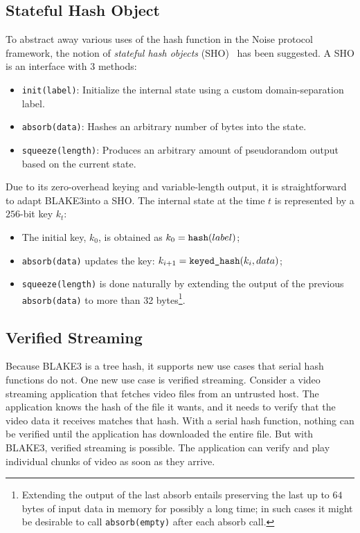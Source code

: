 \documentclass[11pt,notitlepage,a4paper]{article}
\newcommand{\flag}[1]{\texttt{\detokenize{#1}}\xspace}
\begin{document}
\subsection{Stateful Hash Object}\label{sec:sho}

To abstract away various uses of the hash function in the Noise protocol framework, the notion of \emph{stateful hash objects} (SHO)~\cite{Perrin19} has been suggested. A SHO is an interface with 3 methods:
\begin{itemize}
  \item \texttt{init(label)}: Initialize the internal state using a custom domain-separation label.
  \item \texttt{absorb(data)}: Hashes an arbitrary number of bytes into the state.
  \item \texttt{squeeze(length)}: Produces an arbitrary amount of pseudorandom output based on the current state.
\end{itemize}
Due to its zero-overhead keying and variable-length output, it is straightforward to adapt BLAKE3into a SHO. The internal state at the time $t$ is represented by a $256$-bit key $k_t$:
\begin{itemize}
  \item The initial key, $k_0$, is obtained as $k_0 = \text{\flag{hash}}(label)$;
  \item \texttt{absorb(data)} updates the key: $k_{i+1} = \text{\flag{keyed_hash}}(k_i, data)$;
  \item \texttt{squeeze(length)} is done naturally by extending the output of the previous \texttt{absorb(data)} to more than 32 bytes\footnote{Extending the output of the last absorb entails preserving the last up to $64$ bytes of input data in memory for possibly a long time; in such cases it might be desirable to call \texttt{absorb(empty)} after each absorb call.}.
\end{itemize}

\subsection{Verified Streaming}\label{sec:verifiedstreaming}

Because BLAKE3 is a tree hash, it supports new use cases that serial hash
functions do not. One new use case is verified streaming. Consider a video
streaming application that fetches video files from an untrusted host. The
application knows the hash of the file it wants, and it needs to verify that
the video data it receives matches that hash. With a serial hash function,
nothing can be verified until the application has downloaded the entire file.
But with BLAKE3, verified streaming is possible. The application can verify and
play individual chunks of video as soon as they arrive.
\end{document}
